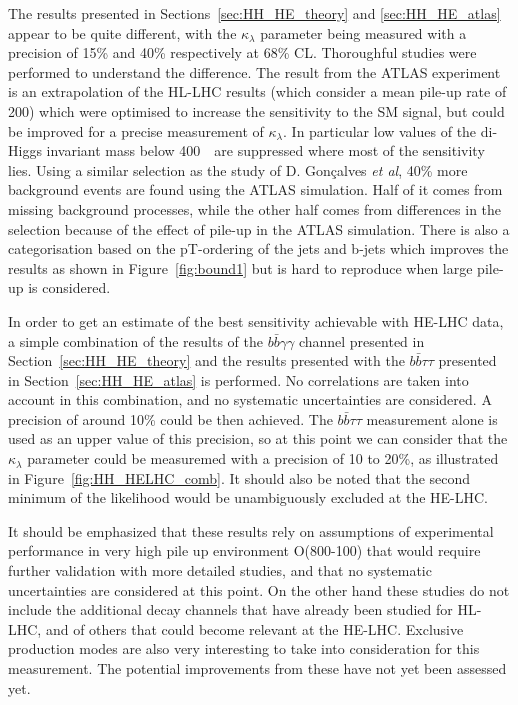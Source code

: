 The results presented in Sections~\ref{sec:HH_HE_theory} and \ref{sec:HH_HE_atlas} appear to be quite different, with the $\kappa_{\lambda}$ parameter being measured with a precision of 15\% and 40\% respectively at 68\% CL.
Thoroughful studies were performed to understand the difference. The result from the ATLAS experiment is an extrapolation of the HL-LHC results (which consider a mean pile-up rate of 200) which were optimised to increase the sensitivity to the SM signal, but could be improved for a precise measurement of $\kappa_{\lambda}$. In particular low values of the di-Higgs invariant mass below 400~\GeV\ are suppressed where most of the sensitivity lies.
Using a similar selection as the study of D. Gon\c{c}alves \textit{et al}, 40\% more background events are found using the ATLAS simulation. Half of it comes from missing background processes, while the other half comes from differences in the selection because of the effect of pile-up in the ATLAS simulation.
There is also a categorisation based on the pT-ordering of the jets and b-jets which improves the results as shown in Figure~\ref{fig:bound1} but is hard to reproduce when large pile-up is considered.


In order to get an estimate of the best sensitivity achievable with HE-LHC data, a simple combination of the results of the $b\bar{b}\gamma\gamma$ channel presented in Section~\ref{sec:HH_HE_theory} and the results presented with the $b\bar{b}\tau\tau$ presented in Section~\ref{sec:HH_HE_atlas} is performed. No correlations are taken into account in this combination, and no systematic uncertainties are considered. A precision of around 10\% could be then achieved. The $b\bar{b}\tau\tau$ measurement alone is used as an upper value of this precision, so at this point we can consider that the $\kappa_{\lambda}$ parameter could be measuremed with a precision of 10 to 20\%, as illustrated in Figure~\ref{fig:HH_HELHC_comb}. It should also be noted that the second minimum of the likelihood would be unambiguously excluded at the HE-LHC.

It should be emphasized that these results rely on assumptions of experimental performance in very high pile up environment O(800-100) that would require further validation with more detailed studies, and that no systematic uncertainties are considered at this point. On the other hand these studies do not include the additional decay channels that have already been studied for HL-LHC, and of others that could become relevant at the HE-LHC. Exclusive production modes are also very interesting to take into consideration for this measurement. The potential improvements from these have not yet been assessed yet.


